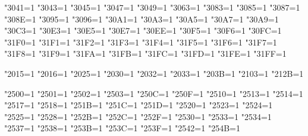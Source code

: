     \def\parseargusing#1#2{%
      \def\argtorun{#2}%
      \begingroup
        \ifx\ltjlineendcomment\thisisundefined
          \catcode"FFFFF=9
        \else
          \catcode\ltjlineendcomment=9
        \fi
        \obeylines
        \spaceisspace
        #1%
        \parseargline\empty%
    }
    \def\comment{\begingroup \catcode`\^^M=\active%
      \ifx\ltjlineendcomment\thisisundefined
        \catcode"FFFFF=9%
      \else
        \catcode\ltjlineendcomment=9%
      \fi
    \catcode`\@=\other \catcode`\{=\other \catcode`\}=\other\commentxxx}%
    \let\setfilename=\comment
    \let\dircategory=\comment
    \let\definfoenclose=\comment
    \let\footnotestyle=\comment
    \def\c{\begingroup \catcode`\^^M=\active%
      \ifx\ltjlineendcomment\thisisundefined
        \catcode"FFFFF=9%
      \else
        \catcode\ltjlineendcomment=9%
      \fi
    \catcode`\@=\other \catcode`\{=\other \catcode`\}=\other%
    \cxxx}
    \let\texinfoc=\c
  \fi %

  \ifx\XeTeXrevision\thisisundefined
  \else
    \def\do#1{\XeTeXcharclass"#1=1 }
    \do{3041}\do{3043}\do{3045}\do{3047}\do{3049}\do{3063}
    \do{3083}\do{3085}\do{3087}\do{308E}\do{3095}\do{3096}
    \do{30A1}\do{30A3}\do{30A5}\do{30A7}\do{30A9}\do{30C3}
    \do{30E3}\do{30E5}\do{30E7}\do{30EE}\do{30F5}\do{30F6}
    \do{30FC}\do{31F0}\do{31F1}\do{31F2}\do{31F3}\do{31F4}
    \do{31F5}\do{31F6}\do{31F7}\do{31F8}\do{31F9}\do{31FA}
    \do{31FB}\do{31FC}\do{31FD}\do{31FE}\do{31FF}

    \do{2015}\do{2016}\do{2025}\do{2030}\do{2032}\do{2033}
    \do{203B}\do{2103}\do{212B}

    \do{2500}\do{2501}\do{2502}\do{2503}\do{250C}\do{250F}
    \do{2510}\do{2513}\do{2514}\do{2517}\do{2518}\do{251B}
    \do{251C}\do{251D}\do{2520}\do{2523}\do{2524}\do{2525}
    \do{2528}\do{252B}\do{252C}\do{252F}\do{2530}\do{2533}
    \do{2534}\do{2537}\do{2538}\do{253B}\do{253C}\do{253F}
    \do{2542}\do{254B}

